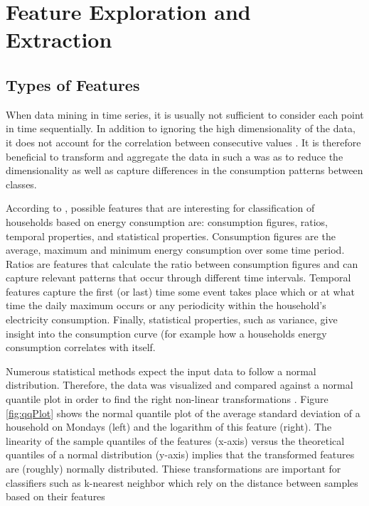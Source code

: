 \chapter{Feature Exploration and Extraction}

\section{Types of Features}
When data mining in time series, it is usually not sufficient to consider each point in time sequentially. In addition to ignoring the high dimensionality of the data,  it does not account for the correlation between consecutive values \cite{Moerchen}. It is therefore beneficial to transform and aggregate the data in such a was as to reduce the dimensionality as well as capture differences in the consumption patterns between classes. 

According to \cite{Beckel 2}, possible features that are interesting for classification of households based on energy consumption are: consumption figures, ratios, temporal properties, and statistical properties. Consumption figures are the average, maximum and minimum energy consumption over some time period. Ratios are features that calculate the ratio between consumption figures and can capture relevant patterns that occur through different time intervals. Temporal features capture the first (or last) time some event takes place which or at what time the daily maximum occurs or any periodicity within the household's electricity consumption. Finally, statistical properties, such as variance, give insight into the consumption curve (for example how a households energy consumption correlates with itself.

Numerous statistical methods expect the input data to follow a normal distribution. Therefore, the data was visualized and compared against a normal quantile plot in order to find the right non-linear transformations \cite{Osborne} \cite{Wang}. Figure \ref{fig:qqPlot} shows the normal quantile plot of the average standard deviation of a household on Mondays (left) and the logarithm of this feature (right). The linearity of the sample quantiles of the features (x-axis) versus the theoretical quantiles of a normal distribution (y-axis) implies that the transformed features are (roughly) normally distributed. Thiese transformations are important for classifiers such as k-nearest neighbor which rely on the distance between samples based on their features

\qqPlot

